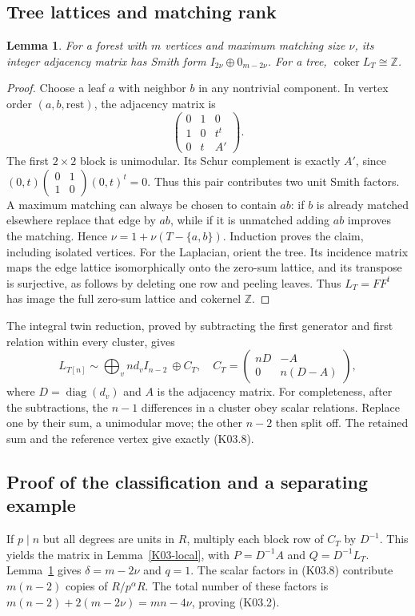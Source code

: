 \documentclass[11pt,a4paper]{article}
\newtheorem{lemma}[theorem]{Lemma}
\theoremstyle{definition}\newtheorem{definition}[theorem]{Definition}
\theoremstyle{remark}\newtheorem{remark}[theorem]{Remark}
\newcommand{\Z}{\mathbb Z}\newcommand{\Q}{\mathbb Q}\newcommand{\F}{\mathbb F}
\DeclareMathOperator{\coker}{coker}\DeclareMathOperator{\diag}{diag}\DeclareMathOperator{\rank}{rank}
\numberwithin{equation}{section}
\begin{document}
\subsection{Tree lattices and matching rank}\label{K03-sec-3}
\begin{lemma}\label{K03-forest}
For a forest with $m$ vertices and maximum matching size $\nu$, its integer adjacency matrix has Smith form $I_{2\nu}\oplus0_{m-2\nu}$. For a tree, $\coker L_T\cong\Z$.
\end{lemma}
\begin{proof}
Choose a leaf $a$ with neighbor $b$ in any nontrivial component. In vertex order $(a,b,\text{rest})$, the adjacency matrix is
\[
 \begin{pmatrix}0&1&0\\1&0&t^t\\0&t&A'\end{pmatrix}.
\]
The first $2\times2$ block is unimodular. Its Schur complement is exactly $A'$, since $(0,t)\left(\begin{smallmatrix}0&1\\1&0\end{smallmatrix}\right)(0,t)^t=0$. Thus this pair contributes two unit Smith factors. A maximum matching can always be chosen to contain $ab$: if $b$ is already matched elsewhere replace that edge by $ab$, while if it is unmatched adding $ab$ improves the matching. Hence $\nu=1+\nu(T-\{a,b\})$. Induction proves the claim, including isolated vertices. For the Laplacian, orient the tree. Its incidence matrix maps the edge lattice isomorphically onto the zero-sum lattice, and its transpose is surjective, as follows by deleting one row and peeling leaves. Thus $L_T=FF^t$ has image the full zero-sum lattice and cokernel $\Z$.
\end{proof}

The integral twin reduction, proved by subtracting the first generator and first relation within every cluster, gives
\[
 L_{T[n]}\sim \bigoplus_v nd_vI_{n-2}\ \oplus C_T,
 \quad C_T=\begin{pmatrix}nD&-A\\0&n(D-A)\end{pmatrix},        \tag{K03.8}
\]
where $D=\diag(d_v)$ and $A$ is the adjacency matrix. For completeness, after the subtractions, the $n-1$ differences in a cluster obey scalar relations. Replace one by their sum, a unimodular move; the other $n-2$ then split off. The retained sum and the reference vertex give exactly (K03.8).

\subsection{Proof of the classification and a separating example}\label{K03-sec-4}
If $p\mid n$ but all degrees are units in $R$, multiply each block row of $C_T$ by $D^{-1}$. This yields the matrix in Lemma~\ref{K03-local}, with $P=D^{-1}A$ and $Q=D^{-1}L_T$. Lemma~\ref{K03-forest} gives $\delta=m-2\nu$ and $q=1$. The scalar factors in (K03.8) contribute $m(n-2)$ copies of $R/p^\alpha R$. The total number of these factors is $m(n-2)+2(m-2\nu)=mn-4\nu$, proving (K03.2).
\end{document}
